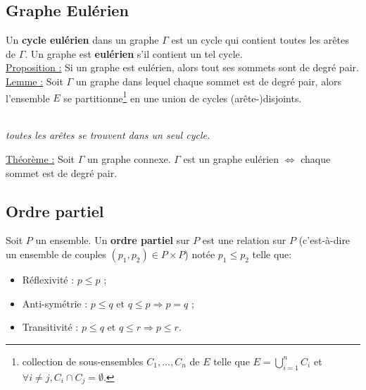 \documentclass[11pt]{article}
\begin{document}
	\subsection{Graphe Eulérien}
		Un \textbf{cycle eulérien} dans un graphe $\Gamma$ est un cycle qui contient toutes les arêtes de $\Gamma$. Un graphe est \textbf{eulérien} s'il contient un tel cycle.\\
		
		\underline{Proposition :} Si un graphe est eulérien, alors tout ses sommets sont de degré pair.\\
		
		\underline{Lemme :} Soit $\Gamma$ un graphe dans lequel chaque sommet est de degré pair, alors l'ensemble $E$ se partitionne\footnote{collection de sous-ensembles $C_1, ..., C_n$ de $E$ telle que $E=\displaystyle\bigcup^n_{i=1} C_i$ et $\forall i \neq j, C_i \cap C_j = \emptyset$.} en une union de cycles (arête-)disjoints.\\
		\begin{center}
			 \\
				\textit{toutes les arêtes se trouvent dans un seul cycle.}
			\end{center} 
			
	\underline{Théorème :}  Soit $\Gamma$ un graphe connexe. $\Gamma$ est un graphe eulérien $\Leftrightarrow$ chaque sommet est de degré pair.
	
    
	\subsection{Ordre partiel}
		Soit $P$ un ensemble. Un \textbf{ordre partiel} sur $P$ est une relation sur $P$ (c'est-à-dire un ensemble de couples $(p_1,p_2) \in P \times P$) notée $p_1 \leq p_2$ telle que:
		\begin{itemize}
			\item Réflexivité : $p \leq p$ ;
			\item Anti-symétrie : $p \leq q$ et $q \leq p \Rightarrow p = q$ ;
			\item Transitivité : $p \leq q$ et $q \leq r \Rightarrow p \leq r$.
		\end{itemize}
\end{document}
